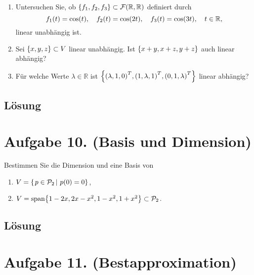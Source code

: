 \documentclass[german,12pt]{homework}
\newcommand{\RR}{\mathbb{R}}
\DeclareMathOperator{\vecspan}{span}
\DeclarePairedDelimiter{\enbrace}{(}{)}
\DeclarePairedDelimiter{\penbrace}{\{}{\}}
\begin{document}
    \begin{problem}
        \begin{enumerate}
            \item Untersuchen Sie, ob \(\penbrace*{f_1, f_2, f_3} \subset \mathcal{F}\enbrace*{\RR, \RR}\) definiert durch
            \[f_1\enbrace*{t} = \cos\enbrace*{t}, \quad
            f_2\enbrace*{t} = \cos\enbrace*{2t}, \quad
            f_3\enbrace*{t} = \cos\enbrace*{3t}, \quad t \in \RR,\]
            linear unabhängig ist.
            \item Sei \(\penbrace*{x, y, z} \subset V\) linear unabhängig. Ist
            \(\penbrace*{x + y, x + z, y + z}\) auch linear abhängig?
            \item Für welche Werte \(\lambda \in \RR\) ist
            \(\penbrace*{\enbrace*{\lambda, 1, 0}^T, \enbrace*{1, \lambda, 1}^T, \enbrace*{0, 1, \lambda}^T}\) linear abhängig?
        \end{enumerate}
    \end{problem}

    \subsection*{Lösung} \clearpage

    \section*{Aufgabe 10. (Basis und Dimension)}

    \begin{problem}
        Bestimmen Sie die Dimension und eine Basis von
        \begin{enumerate}
            \item \(V = \penbrace*{\left.p \in \mathcal{P}_2\,\right|\,p\enbrace*{0} = 0}\),
            \item \(V = \vecspan\penbrace*{1 - 2x, 2x - x^2, 1 - x^2, 1 + x^2}
            \subset \mathcal{P}_2\).
        \end{enumerate}
    \end{problem}

    \subsection*{Lösung} \clearpage

    \section*{Aufgabe 11. (Bestapproximation)}
\end{document}
